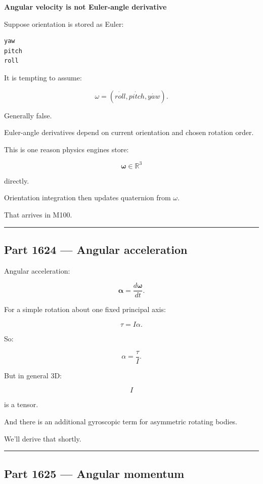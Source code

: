 \textbf{Angular velocity is not Euler-angle derivative}

Suppose orientation is stored as Euler:

\begin{verbatim}
yaw
pitch
roll
\end{verbatim}

It is tempting to assume:

\[
\omega
=
(\dot{roll},\dot{pitch},\dot{yaw}).
\]

Generally false.

Euler-angle derivatives depend on current orientation and chosen rotation order.

This is one reason physics engines store:

\[
\boldsymbol{\omega}\in\mathbb{R}^3
\]

directly.

Orientation integration then updates quaternion from \(\omega\).

That arrives in M100.

\begin{center}\rule{0.5\linewidth}{0.5pt}\end{center}

\subsection{Part 1624 --- Angular acceleration}\label{06-engine-ii-ch035-part-1624-angular-acceleration}

Angular acceleration:

\[
\boxed{
\boldsymbol{\alpha}
=
\frac{d\boldsymbol{\omega}}{dt}.
}
\]

For a simple rotation about one fixed principal axis:

\[
\tau=I\alpha.
\]

So:

\[
\alpha
=
\frac{\tau}{I}.
\]

But in general 3D:

\[
I
\]

is a tensor.

And there is an additional gyroscopic term for asymmetric rotating bodies.

We'll derive that shortly.

\begin{center}\rule{0.5\linewidth}{0.5pt}\end{center}

\subsection{Part 1625 --- Angular momentum}\label{06-engine-ii-ch035-part-1625-angular-momentum}

